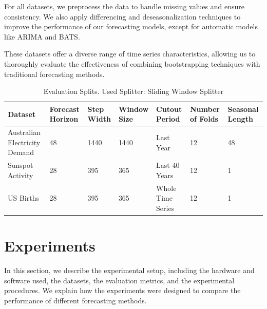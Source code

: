 \documentclass{article}
\begin{document}
For all datasets, we preprocess the data to handle missing values and ensure consistency. We also apply differencing and deseasonalization techniques to improve the performance of our forecasting models, except for automatic models like ARIMA and BATS.

These datasets offer a diverse range of time series characteristics, allowing us to thoroughly evaluate the effectiveness of combining bootstrapping techniques with traditional forecasting methods.

\begin{table}[h]
    \centering
    \footnotesize

    \caption{Evaluation Splits. Used Splitter: Sliding Window Splitter}
    \label{tab:evaluation_splits}
    \begin{tabularx}{\textwidth}{X|X|X|X|X|X|X}
         \toprule
        Dataset & Forecast Horizon & Step Width & Window Size & Cutout Period & Number of Folds & Seasonal Length \\ \midrule
        Australian Electricity Demand & 48 & 1440 & 1440 & Last Year & 12 & 48 \\ 
        Sunspot Activity & 28 & 395 & 365 & Last 40 Years & 12 & 1\\
        US Births & 28 & 395 & 365 & Whole Time Series & 12 & 1 \\
        \bottomrule
    \end{tabularx}
\end{table}

\section{Experiments} \label{experiments}
In this section, we describe the experimental setup, including the hardware and software used, the datasets, the evaluation metrics, and the experimental procedures. We explain how the experiments were designed to compare the performance of different forecasting methods.




\end{document}
